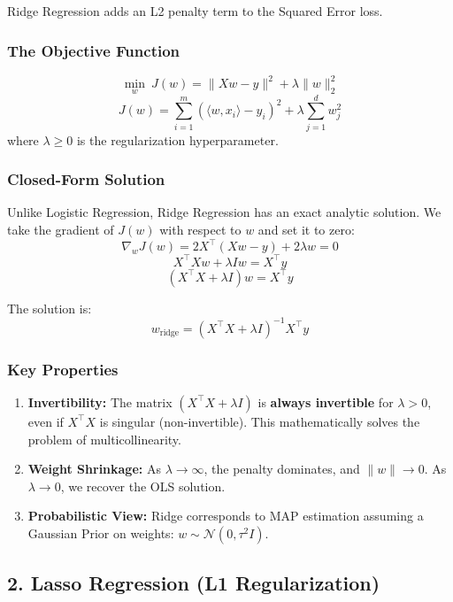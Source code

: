 \documentclass[
  italian,
  11pt,
]{article}
\providecommand{\tightlist}{%
  \setlength{\itemsep}{0pt}\setlength{\parskip}{0pt}}
\begin{document}
Ridge Regression adds an L2 penalty term to the Squared Error loss.

\subsubsection{The Objective Function}\label{the-objective-function}

\[ \min_{w} \ J(w) = \| Xw - y \|^2 + \lambda \| w \|_2^2 \]
\[ J(w) = \sum_{i=1}^{m} (\langle w, x_i \rangle - y_i)^2 + \lambda \sum_{j=1}^{d} w_j^2 \]
where \(\lambda \ge 0\) is the regularization hyperparameter.

\subsubsection{Closed-Form Solution}\label{closed-form-solution}

Unlike Logistic Regression, Ridge Regression has an exact analytic
solution. We take the gradient of \(J(w)\) with respect to \(w\) and set
it to zero: \[ \nabla_w J(w) = 2 X^\top (Xw - y) + 2 \lambda w = 0 \]
\[ X^\top X w + \lambda I w = X^\top y \]
\[ (X^\top X + \lambda I) w = X^\top y \]

The solution is:
\[ w_{\text{ridge}} = (X^\top X + \lambda I)^{-1} X^\top y \]

\subsubsection{Key Properties}\label{key-properties}

\begin{enumerate}
\def\labelenumi{\arabic{enumi}.}
\tightlist
\item
  \textbf{Invertibility:} The matrix \((X^\top X + \lambda I)\) is
  \textbf{always invertible} for \(\lambda > 0\), even if \(X^\top X\)
  is singular (non-invertible). This mathematically solves the problem
  of multicollinearity.
\item
  \textbf{Weight Shrinkage:} As \(\lambda \to \infty\), the penalty
  dominates, and \(\|w\| \to 0\). As \(\lambda \to 0\), we recover the
  OLS solution.
\item
  \textbf{Probabilistic View:} Ridge corresponds to MAP estimation
  assuming a Gaussian Prior on weights:
  \(w \sim \mathcal{N}(0, \tau^2 I)\).
\end{enumerate}

\subsection{2. Lasso Regression (L1
Regularization)}\label{lasso-regression-l1-regularization}
\end{document}
